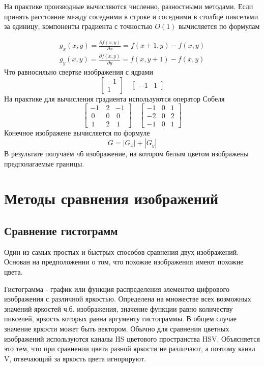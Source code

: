 \documentclass[oneside,final,14pt]{extreport}
\begin{document}
 На практике производные вычисляются численно, разностными методами. Если принять расстояние между соседними в строке и соседними в столбце пикселями за единицу, компоненты градиента с точностью $O(1)$ вычисляется по формулам

\begin{gather}
g_x(x,y) 
= 
\frac{\partial f(x,y)}
{\partial x}
=
f(x+1,y) - f(x,y)
\\
g_y(x,y) 
= 
\frac{\partial f(x,y)}
{\partial y}
=
f(x,y+1) - f(x,y)
\end{gather}
Что равносильно свертке изображения с ядрами 
\begin{equation}
\begin{bmatrix}
-1\\1
\end{bmatrix}
\quad
\begin{bmatrix}
-1 & 1
\end{bmatrix}
\end{equation}
На практике для вычисления градиента используются оператор Собеля
\begin{equation}
\begin{bmatrix}
 -1 & \,2 & -1 \\
\,0 & \,0 &\,0 \\
\,1 & \,2 &\,1
\end{bmatrix}
\quad
\begin{bmatrix}
-1 & 0 &  1 \\
-2 & 0 &  2 \\
-1 & 0 &  1
\end{bmatrix}	
\end{equation}
Конечное изображене вычисляется 	по формуле
\begin{equation}
G
=
|G_x| + |G_y|
\end{equation}
В результате получаем чб изображение, на котором белым цветом изображены предполагаемые границы.

\chapter{Методы сравнения изображений}
\section{Сравнение гистограмм}
Один из самых простых и быстрых способов сравнения  двух изображений. Основан на предположении о том, что похожие изображения имеют похожие цвета. 

Гистограмма - график  или функция распределения элементов цифрового изображения с различной яркостью. Определена на множестве всех возможных значений яркостей ч.б. изображения, значение функции равно количеству пикселей, яркость которых равна аргументу гистограммы. В общем случае значение яркости может быть вектором. Обычно для сравнения цветных изображений используются каналы HS цветового пространства HSV. Объясняется это тем, что при сравнении цвета разной яркости не различают, а поэтому канал V, отвечающий за яркость цвета игнорируют.  
\end{document}
